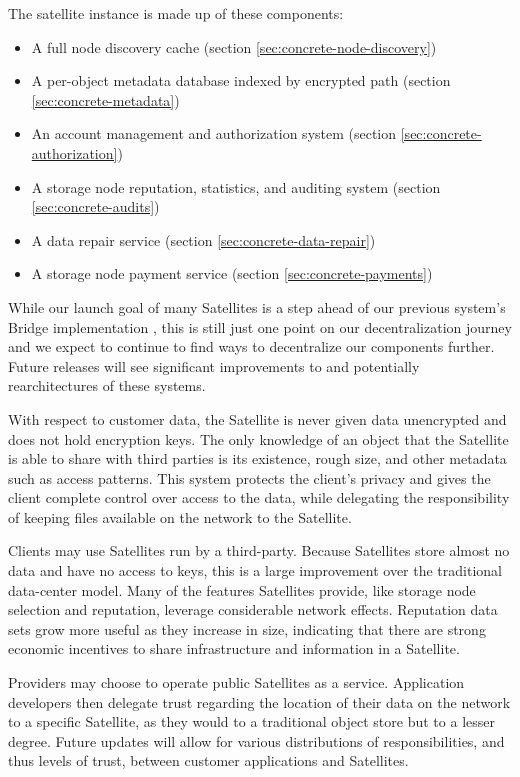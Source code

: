 \documentclass[8pt,fleqn,openany]{book}
\begin{document}
The satellite instance is made up of these components:
\begin{itemize}
\item A full node discovery cache (section \ref{sec:concrete-node-discovery})
\item A per-object metadata database indexed by encrypted path
  (section \ref{sec:concrete-metadata})
\item An account management and authorization system
  (section \ref{sec:concrete-authorization})
\item A storage node reputation, statistics, and auditing system
  (section \ref{sec:concrete-audits})
\item A data repair service (section \ref{sec:concrete-data-repair})
\item A storage node payment service (section \ref{sec:concrete-payments})
\end{itemize}

While our launch goal of many Satellites is a step ahead of our previous
system's Bridge implementation \cite{storj-v2}, this is still just one point on
our decentralization journey and we expect to continue to find ways to
decentralize our components further.
Future releases will see significant improvements to and potentially
rearchitectures of these systems.

With respect to customer data, the Satellite is
never given data unencrypted and does not hold encryption keys.
The only knowledge of an object that the Satellite is able to share with
third parties is its existence, rough size, and other metadata such as access
patterns.
This system protects the client's privacy and gives the client complete
control over access to the data,
while delegating the responsibility of keeping files available on the network
to the Satellite.

Clients may use Satellites run by a third-party. Because Satellites store almost no
data and have no access to keys, this is a large improvement over the
traditional data-center model. Many of the features Satellites provide, like
storage node selection and reputation, leverage considerable network effects.
Reputation data sets grow more useful as they increase in size,
indicating that there are strong economic incentives to share infrastructure
and information in a Satellite.

Providers may choose to operate public Satellites as a service.
Application developers then delegate trust regarding the location of their
data on the network to a specific Satellite, as they
would to a traditional object store but to a lesser degree. Future updates
will allow for various distributions of responsibilities, and thus levels of
trust, between customer applications and Satellites.
\end{document}
